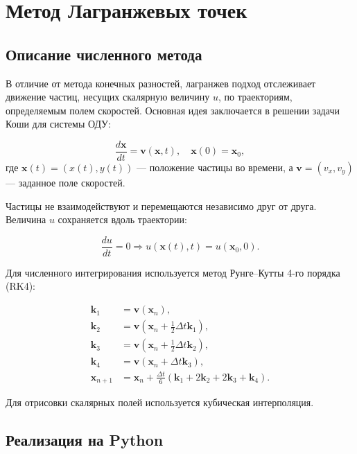 \newpage

\section{Метод Лагранжевых точек}
\subsection{Описание численного метода}

В отличие от метода конечных разностей, лагранжев подход отслеживает движение частиц, несущих скалярную величину \( u \), по траекториям, определяемым полем скоростей. Основная идея заключается в решении задачи Коши для системы ОДУ:

\[
\frac{d \mathbf{x}}{dt} = \mathbf{v}(\mathbf{x}, t), \quad \mathbf{x}(0) = \mathbf{x}_0,
\]
где \( \mathbf{x}(t) = (x(t), y(t)) \) — положение частицы во времени, а \( \mathbf{v} = (v_x, v_y) \) — заданное поле скоростей.

Частицы не взаимодействуют и перемещаются независимо друг от друга. Величина \( u \) сохраняется вдоль траектории:

\[
\frac{du}{dt} = 0 \Rightarrow u(\mathbf{x}(t), t) = u(\mathbf{x}_0, 0).
\]

Для численного интегрирования используется метод Рунге–Кутты 4-го порядка (RK4):

\begin{equation}
	\begin{aligned}
		\mathbf{k}_1 &= \mathbf{v}(\mathbf{x}_n), \\
		\mathbf{k}_2 &= \mathbf{v}(\mathbf{x}_n + \tfrac{1}{2} \Delta t \mathbf{k}_1), \\
		\mathbf{k}_3 &= \mathbf{v}(\mathbf{x}_n + \tfrac{1}{2} \Delta t \mathbf{k}_2), \\
		\mathbf{k}_4 &= \mathbf{v}(\mathbf{x}_n + \Delta t \mathbf{k}_3), \\
		\mathbf{x}_{n+1} &= \mathbf{x}_n + \frac{\Delta t}{6} (\mathbf{k}_1 + 2\mathbf{k}_2 + 2\mathbf{k}_3 + \mathbf{k}_4).
	\end{aligned}
	\label{eq:rk4}
\end{equation}

Для отрисовки скалярных полей используется кубическая интерполяция.

\subsection{Реализация на Python}

